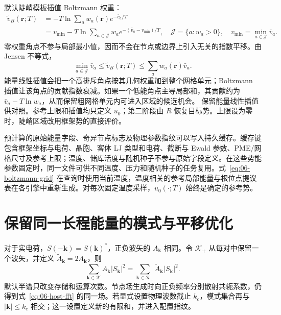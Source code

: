 默认陡峭模板插值 Boltzmann 权重：
\begin{align}
\widetilde v_B(\mathbf r;T)
&=-T\ln\sum_a w_a(\mathbf r)e^{-\bar v_a/T}\nonumber\\
&=v_{\min}-T\ln\sum_{a\in\mathcal J}w_a
e^{-(\bar v_a-v_{\min})/T},\quad
\mathcal J=\{a:w_a>0\},\quad v_{\min}=\min_{a\in\mathcal J}\bar v_a.
\label{eq:06-boltzmann-grid}
\end{align}
零权重角点不参与局部最小值，因而不会在节点或边界上引入无关的指数平移。由 Jensen 不等式，
\begin{equation}
\min_{a\in\mathcal J}\bar v_a
\le\widetilde v_B(\mathbf r;T)
\le\sum_a w_a(\mathbf r)\bar v_a.
\label{eq:06-jensen}
\end{equation}
能量线性插值会把一个高排斥角点按其几何权重加到整个网格单元；Boltzmann 插值让该角点的贡献指数衰减。如果一个低能角点主导局部和，其贡献约为 $\bar v_a-T\ln w_a$，从而保留粗网格单元内可进入区域的候选机会。 保留能量线性插值供对照。参考上限和插值均只定义 $u_0$；第二阶段由 $R$ 恢复目标势。上限设为零时，陡峭区域改用框架势的直接评价。

预计算的原始能量字段、奇异节点标志及物理参数指纹可以写入持久缓存。缓存键包含框架坐标与电荷、晶胞、客体 LJ 类型和电荷、截断与 Ewald 参数、PME/网格尺寸及参考上限；温度、储库活度与随机种子不参与原始字段定义。在这些势能参数固定时，同一文件可供不同温度、压力和随机种子的任务复用。式~\eqref{eq:06-boltzmann-grid} 在查询时使用当前温度，温度相关的参考局部能量与根位点提议表在各引擎中重新生成。对每次固定温度采样，$u_0(\cdot;T)$ 始终是确定的参考势。

\section{保留同一长程能量的模式与平移优化}
\label{sec:06-spectral}

对于实电荷，$S(-\mathbf k)=S(\mathbf k)^*$，正负波矢的 $A_{\mathbf k}$ 相同。令 $\mathcal K_+$ 从每对中保留一个波矢，并定义 $\widetilde A_{\mathbf k}=2A_{\mathbf k}$，则
\begin{equation}
\sum_{\mathbf k\in\mathcal K}A_{\mathbf k}|S_{\mathbf k}|^2
=\sum_{\mathbf k\in\mathcal K_+}\widetilde A_{\mathbf k}|S_{\mathbf k}|^2.
\label{eq:06-half-spectrum}
\end{equation}
默认半谱只改变存储和运算次数。节点场生成时向正负频率分别散射共轭系数，仍得到式~\eqref{eq:06-host-fft} 的同一场。若显式设置物理波数截止 $k_c$，模式集合再与 $|\mathbf k|\le k_c$ 相交；这一设置定义新的有限和，并进入配置指纹。

